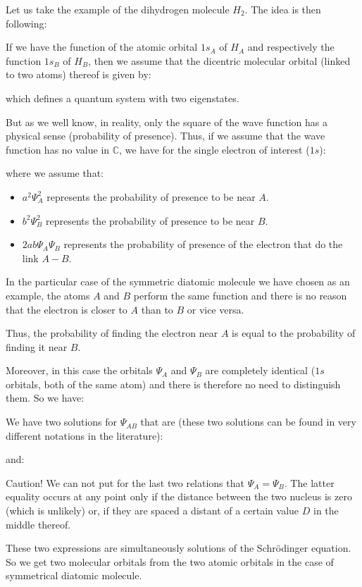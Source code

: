 	Let us take the example of the dihydrogen molecule $H_2$. The idea is then following:
	
	If we have the function of the atomic orbital $1s_A$ of $H_A$ and respectively the function $1s_B$ of $H_B$, then we assume that the dicentric molecular orbital (linked to two atoms) thereof is given by:
	
	which defines a quantum system with two eigenstates.

	But as we well know, in reality, only the square of the wave function has a physical sense (probability of presence). Thus, if we assume that the wave function has no value in $\mathbb{C}$, we have for the single electron of interest ($1s$):
	
	where we assume that:
	\begin{itemize}
		\item $a^2\Psi_A^2$ represents the probability of presence to be near $A$.
		\item $b^2\Psi_B^2$ represents the probability of presence to be near $B$.
		\item $2ab\Psi_A\Psi_B$ represents the probability of presence of the electron that do the link $A-B$.
	\end{itemize}
	In the particular case of the symmetric diatomic molecule we have chosen as an example, the atoms $A$ and $B$ perform the same function and there is no reason that the electron is closer to $A$ than to $B$ or vice versa.

	Thus, the probability of finding the electron near $A$ is equal to the probability of finding it near $B$.
	
	Moreover, in this case the orbitals $\Psi_A$ and $\Psi_B$ are completely identical ($1s$ orbitals, both of the same atom) and there is therefore no need to distinguish them. So we have:
	
	We have two solutions for $\Psi_{AB}$ that are (these two solutions can be found in very different notations in the literature):
	
	and:
	 
	\begin{tcolorbox}[title=Remark,colframe=black,arc=10pt]
	Caution! We can not put for the last two relations that $\Psi_A=\Psi_B$. The latter equality occurs at any point only if the distance between the two nucleus is zero (which is unlikely) or, if they are spaced a distant of a certain value $D$ in the middle thereof.
	\end{tcolorbox}
	These two expressions are simultaneously solutions of the Schrödinger equation. So we get two molecular orbitals from the two atomic orbitals in the case of symmetrical diatomic molecule.
	
